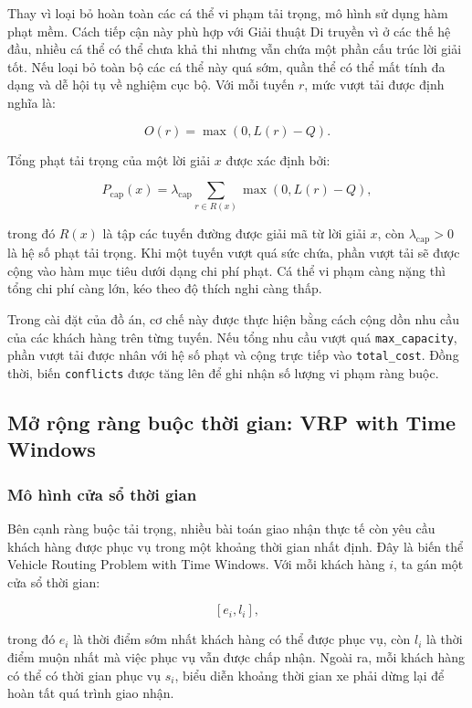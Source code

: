 \documentclass[12pt,a4paper]{article}
\numberwithin{figure}{subsection}
\numberwithin{table}{subsection}
\begin{document}
Thay vì loại bỏ hoàn toàn các cá thể vi phạm tải trọng, mô hình sử dụng hàm phạt mềm. Cách tiếp cận này phù hợp với Giải thuật Di truyền vì ở các thế hệ đầu, nhiều cá thể có thể chưa khả thi nhưng vẫn chứa một phần cấu trúc lời giải tốt. Nếu loại bỏ toàn bộ các cá thể này quá sớm, quần thể có thể mất tính đa dạng và dễ hội tụ về nghiệm cục bộ. Với mỗi tuyến $r$, mức vượt tải được định nghĩa là:

\[
O(r) = \max(0, L(r) - Q).
\]

Tổng phạt tải trọng của một lời giải $x$ được xác định bởi:

\[
P_{\text{cap}}(x)
=
\lambda_{\text{cap}}
\sum_{r \in R(x)}
\max(0, L(r) - Q),
\]

trong đó $R(x)$ là tập các tuyến đường được giải mã từ lời giải $x$, còn $\lambda_{\text{cap}} > 0$ là hệ số phạt tải trọng. Khi một tuyến vượt quá sức chứa, phần vượt tải sẽ được cộng vào hàm mục tiêu dưới dạng chi phí phạt. Cá thể vi phạm càng nặng thì tổng chi phí càng lớn, kéo theo độ thích nghi càng thấp.

Trong cài đặt của đồ án, cơ chế này được thực hiện bằng cách cộng dồn nhu cầu của các khách hàng trên từng tuyến. Nếu tổng nhu cầu vượt quá \texttt{max\_capacity}, phần vượt tải được nhân với hệ số phạt và cộng trực tiếp vào \texttt{total\_cost}. Đồng thời, biến \texttt{conflicts} được tăng lên để ghi nhận số lượng vi phạm ràng buộc.

\subsection{Mở rộng ràng buộc thời gian: VRP with Time Windows}

\subsubsection{Mô hình cửa sổ thời gian}

Bên cạnh ràng buộc tải trọng, nhiều bài toán giao nhận thực tế còn yêu cầu khách hàng được phục vụ trong một khoảng thời gian nhất định. Đây là biến thể Vehicle Routing Problem with Time Windows. Với mỗi khách hàng $i$, ta gán một cửa sổ thời gian:

\[
[e_i, l_i],
\]

trong đó $e_i$ là thời điểm sớm nhất khách hàng có thể được phục vụ, còn $l_i$ là thời điểm muộn nhất mà việc phục vụ vẫn được chấp nhận. Ngoài ra, mỗi khách hàng có thể có thời gian phục vụ $s_i$, biểu diễn khoảng thời gian xe phải dừng lại để hoàn tất quá trình giao nhận.
\end{document}
